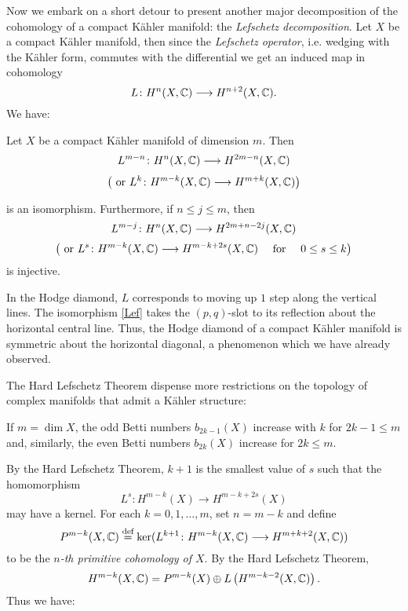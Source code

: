 \documentclass[../main.tex]{subfiles}
\begin{document}
Now we embark on a short detour to present another major decomposition of the cohomology of a compact K\"{a}hler manifold: the \emph{Lefschetz decomposition}. Let $X$ be a compact K\"{a}hler manifold, then since the \emph{Lefschetz operator}, i.e. wedging with the K\"{a}hler form, commutes with the differential we get an induced map in cohomology
\[L \colon H^n(X,\mathbb{C}) \longrightarrow H^{n+2}(X,\mathbb{C}).\]
We have:

\begin{theorem} \textup{\cite[Sect. 6.2.3]{Voi07}} 
\label{HardLef}
Let $X$ be a compact K\"{a}hler manifold of dimension $m$. Then
\begin{align} \label{Lef}
    L^{m-n}\colon H^n(X,\mathbb{C}) \longrightarrow H^{2m-n}(X,\mathbb{C})
\end{align}
\[ \left( \text{ or } L^{k}\colon H^{m-k}(X,\mathbb{C}) \longrightarrow H^{m+k}(X,\mathbb{C}) \right)\]

is an isomorphism. Furthermore, if $n \leq j \leq m$, then
\[
L^{m-j}\colon H^n(X,\mathbb{C}) \longrightarrow H^{2m+n-2j}(X,\mathbb{C})
\]
\[ \left( \text{ or } 
L^{s}\colon H^{m-k}(X,\mathbb{C}) \longrightarrow H^{m-k+2s}(X,\mathbb{C}) \quad \text{ for } \quad 0 \leq s \leq k \right)
\]
is injective.
\end{theorem}
In the Hodge diamond, $L$ corresponds to moving up $1$ step along the vertical lines. The isomorphism \eqref{Lef} takes the $(p,q)$-slot to its reflection about the horizontal central line. Thus, the Hodge diamond of a compact K\"{a}hler manifold is symmetric about the horizontal diagonal, a phenomenon which we have already observed.

The Hard Lefschetz Theorem dispense more restrictions on the topology of complex manifolds that admit a K\"{a}hler structure:

\begin{cor} If $m = \dim X$, the odd Betti numbers $b_{2k-1}(X)$ increase with $k$ for $2k - 1 \leq m$ and, similarly, the even Betti numbers $b_{2k}(X)$ increase for $2k \leq m$.
\end{cor}

By the Hard Lefschetz Theorem, $k+1$ is the smallest value of $s$ such that the homomorphism
\[
 L^s \colon H^{m-k}(X) \to H^{m-k+2s}(X)
\]
may have a kernel.
For each $k=0,1,\dots,m$, set $n=m-k$ and define
\[
P^{m-k}(X,\mathbb{C}) \stackrel{\text{def}}{=} \ker(L^{k+1}\colon H^{m-k}(X,\mathbb{C}) \longrightarrow H^{m+k+2}(X,\mathbb{C}))
\]
to be the \emph{$n$-th primitive cohomology of $X$}. By the Hard Lefschetz Theorem,
\[
 H^{m-k}(X,\mathbb{C}) = P^{m-k}(X) \oplus L \left( H^{m-k-2}(X,\mathbb{C}) \right).
\]
Thus we have:
\end{document}
